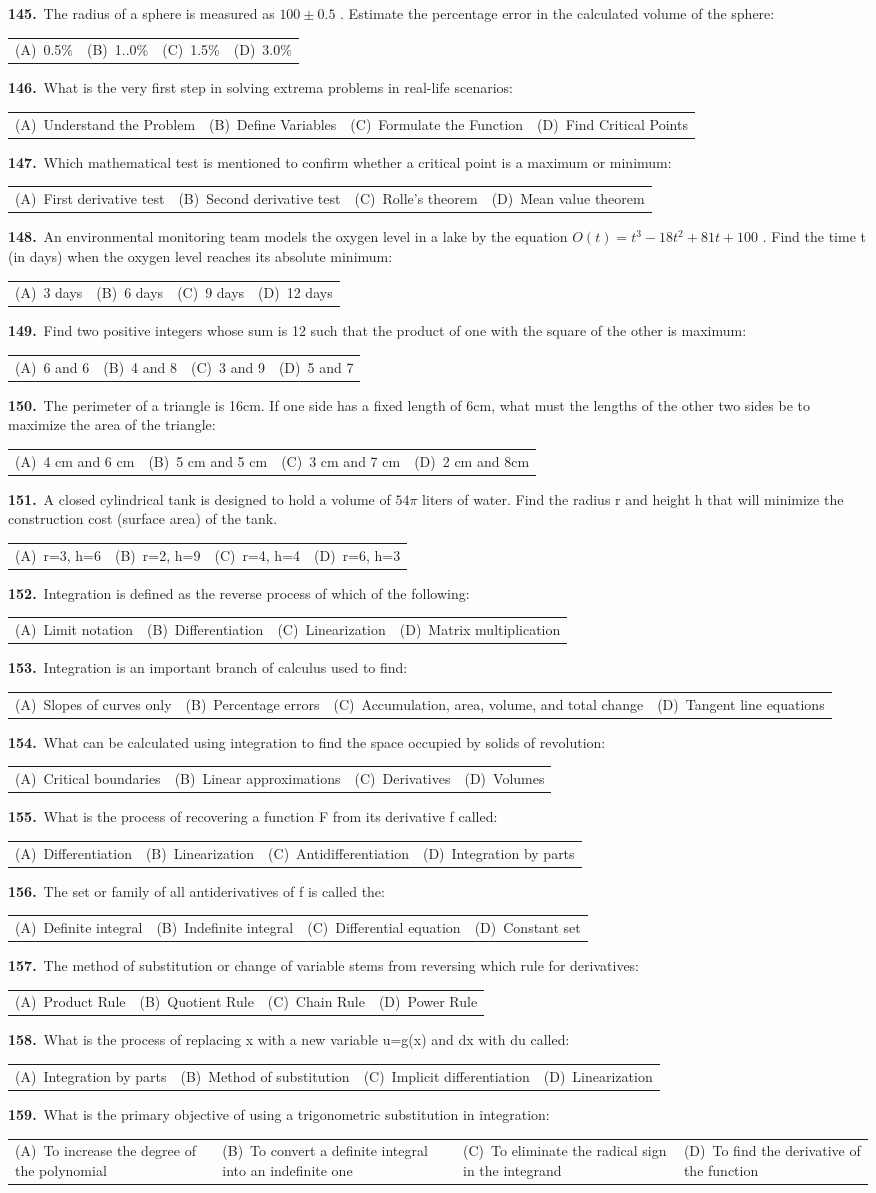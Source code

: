\documentclass[11pt,a4paper]{article}
\makeatletter
\newcommand{\mcq}[6]{%
  \Needspace{4\baselineskip}%
  \par\medskip\noindent\textbf{#1.}\ #2\par\nopagebreak
  \noindent\begin{tabularx}{\linewidth}{@{\hspace{1.5em}}*{4}{>{\raggedright\arraybackslash}X}@{}}
    (A)~#3 & (B)~#4 & (C)~#5 & (D)~#6
  \end{tabularx}\par}
\makeatother
\begin{document}
\mcq{145}{The radius of a sphere is measured as $100\pm0.5$ . Estimate the percentage error in the calculated volume of the sphere:}{0.5\%}{1..0\%}{1.5\%}{3.0\%}
\mcq{146}{What is the very first step in solving extrema problems in real-life scenarios:}{Understand the Problem}{Define Variables}{Formulate the Function}{Find Critical Points}
\mcq{147}{Which mathematical test is mentioned to confirm whether a critical point is a maximum or minimum:}{First derivative test}{Second derivative test}{Rolle's theorem}{Mean value theorem}
\mcq{148}{An environmental monitoring team models the oxygen level in a lake by the equation $O(t)=t^{3}-18t^{2}+81t+100$ . Find the time t (in days) when the oxygen level reaches its absolute minimum:}{3 days}{6 days}{9 days}{12 days}
\mcq{149}{Find two positive integers whose sum is 12 such that the product of one with the square of the other is maximum:}{6 and 6}{4 and 8}{3 and 9}{5 and 7}
\mcq{150}{The perimeter of a triangle is 16cm. If one side has a fixed length of 6cm, what must the lengths of the other two sides be to maximize the area of the triangle:}{4 cm and 6 cm}{5 cm and 5 cm}{3 cm and 7 cm}{2 cm and 8cm}
\mcq{151}{A closed cylindrical tank is designed to hold a volume of $54\pi$ liters of water. Find the radius r and height h that will minimize the construction cost (surface area) of the tank.}{r=3, h=6}{r=2, h=9}{r=4, h=4}{r=6, h=3}
\mcq{152}{Integration is defined as the reverse process of which of the following:}{Limit notation}{Differentiation}{Linearization}{Matrix multiplication}
\mcq{153}{Integration is an important branch of calculus used to find:}{Slopes of curves only}{Percentage errors}{Accumulation, area, volume, and total change}{Tangent line equations}
\mcq{154}{What can be calculated using integration to find the space occupied by solids of revolution:}{Critical boundaries}{Linear approximations}{Derivatives}{Volumes}
\mcq{155}{What is the process of recovering a function F from its derivative f called:}{Differentiation}{Linearization}{Antidifferentiation}{Integration by parts}
\mcq{156}{The set or family of all antiderivatives of f is called the:}{Definite integral}{Indefinite integral}{Differential equation}{Constant set}
\mcq{157}{The method of substitution or change of variable stems from reversing which rule for derivatives:}{Product Rule}{Quotient Rule}{Chain Rule}{Power Rule}
\mcq{158}{What is the process of replacing x with a new variable u=g(x) and dx with du called:}{Integration by parts}{Method of substitution}{Implicit differentiation}{Linearization}
\mcq{159}{What is the primary objective of using a trigonometric substitution in integration:}{To increase the degree of the polynomial}{To convert a definite integral into an indefinite one}{To eliminate the radical sign in the integrand}{To find the derivative of the function}
\end{document}
